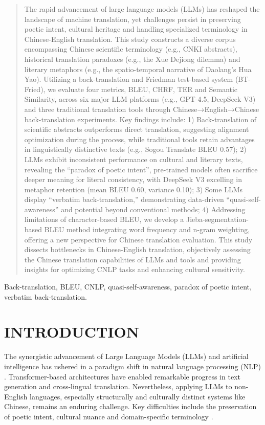 \documentclass[conference]{IEEEtran}
\begin{document}
\begin{CJK}{UTF8}{gbsn}
\begin{abstract}
The rapid advancement of large language models (LLMs) has reshaped the landscape of machine translation, yet challenges persist in preserving poetic intent, cultural heritage and handling specialized terminology in Chinese-English translation. This study constructs a diverse corpus encompassing Chinese scientific terminology (e.g., CNKI abstracts), historical translation paradoxes (e.g., the Xue Dejiong dilemma) and literary metaphors (e.g., the spatio-temporal narrative of Daolang’s Hua Yao). Utilizing a back-translation and Friedman test-based system (BT-Fried), we evaluate four metrics, BLEU, CHRF, TER and Semantic Similarity, across six major LLM platforms (e.g., GPT-4.5, DeepSeek V3) and three traditional translation tools through Chinese→English→Chinese back-translation experiments. Key findings include: 1) Back-translation of scientific abstracts outperforms direct translation, suggesting alignment optimization during the process, while traditional tools retain advantages in linguistically distinctive texts (e.g., Sogou Translate BLEU 0.57); 2) LLMs exhibit inconsistent performance on cultural and literary texts, revealing the ``paradox of poetic intent'', pre-trained models often sacrifice deeper meaning for literal consistency, with DeepSeek V3 excelling in metaphor retention (mean BLEU 0.60, variance 0.10); 3) Some LLMs display ``verbatim back-translation,'' demonstrating data-driven ``quasi-self-awareness'' and potential beyond conventional methods; 4) Addressing limitations of character-based BLEU, we develop a Jieba-segmentation-based BLEU method integrating word frequency and n-gram weighting, offering a new perspective for Chinese translation evaluation. This study dissects bottlenecks in Chinese-English translation, objectively assessing the Chinese translation capabilities of LLMs and tools and providing insights for optimizing CNLP tasks and enhancing cultural sensitivity.
\end{abstract}

\begin{IEEEkeywords}
Back-translation, BLEU, CNLP, quasi-self-awareness, paradox of poetic intent, verbatim back-translation.
\end{IEEEkeywords}

\section{INTRODUCTION}

The synergistic advancement of Large Language Models (LLMs) and artificial intelligence has ushered in a paradigm shift in natural language processing (NLP) \citep{vaswani2017attention}. Transformer-based architectures have enabled remarkable progress in text generation and cross-lingual translation. Nevertheless, applying LLMs to non-English languages, especially structurally and culturally distinct systems like Chinese, remains an enduring challenge. Key difficulties include the preservation of poetic intent, cultural nuance and domain-specific terminology \citep{zhang2021study, zhong2024beyond}.


\end{CJK}
\end{document}
